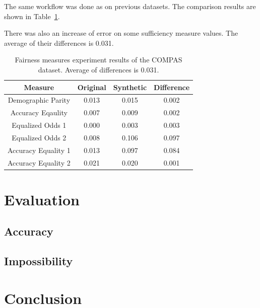 \documentclass[manuscript,screen,review,anonymous]{acmart}
\begin{document}
The same workflow was done as on previous datasets. The comparison results are shown in Table~\ref{tab:diabetes_score}.

There was also an increase of error on some sufficiency measure values. The average of their differences is 0.031.

\begin{table}[h]
\caption{Fairness measures experiment results of the COMPAS dataset. Average of differences is 0.031.}
\label{tab:diabetes_score}
\begin{tabular}{cccc}
\toprule
\textbf{Measure} & \textbf{Original} & \textbf{Synthetic} & \textbf{Difference} \\
\midrule
Demographic Parity  & 0.013 & 0.015 & 0.002 \\
Accuracy Eqaulity   & 0.007 & 0.009 & 0.002 \\
Equalized Odds 1    & 0.000 & 0.003 & 0.003 \\
Equalized Odds 2    & 0.008 & 0.106 & 0.097 \\
Accuracy Equality 1 & 0.013 & 0.097 & 0.084 \\
Accuracy Equality 2 & 0.021 & 0.020 & 0.001 \\
\bottomrule
\end{tabular}
\end{table}

\section{Evaluation}

\subsection{Accuracy}

\subsection{Impossibility}

\section{Conclusion}










\end{document}
